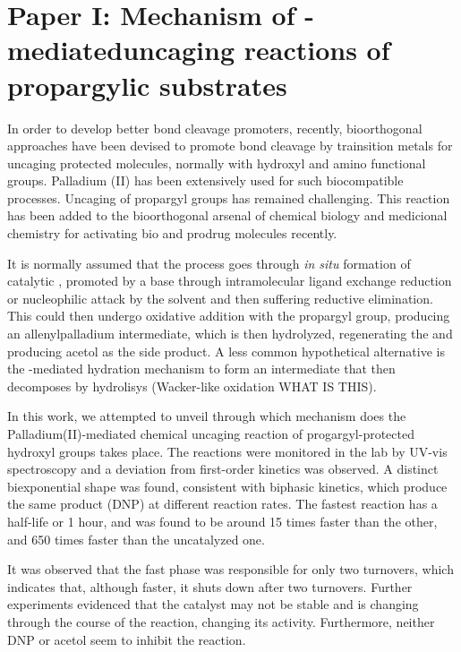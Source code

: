 \chapter{Paper I:\@
  Mechanism of -mediated\linebreak uncaging reactions %
  of propargylic substrates
 }%
\label{ch:paper1}


In order to develop better  bond cleavage promoters,
recently, bioorthogonal approaches have been devised to promote  bond
cleavage by trainsition metals for uncaging protected molecules, normally with
hydroxyl and amino functional groups.
Palladium (II) has been extensively used for such biocompatible processes.
Uncaging of propargyl groups has remained challenging.
This reaction has been added to the bioorthogonal arsenal of chemical biology and
medicional chemistry for activating bio and prodrug molecules recently.

It is normally assumed that the process goes through \emph{in situ} formation
of catalytic , promoted by a base through intramolecular ligand exchange
reduction or nucleophilic attack by the solvent and then suffering reductive
elimination. This  could then undergo oxidative addition with the
propargyl group, producing an allenylpalladium intermediate, which is then
hydrolyzed, regenerating the  and producing acetol as the side product.
A less common hypothetical alternative is the -mediated hydration
mechanism to form an intermediate that then decomposes by hydrolisys
(Wacker-like oxidation WHAT IS THIS).

In this work, we attempted to unveil through which mechanism does
the Palladium(II)-mediated chemical uncaging reaction of
progargyl-protected hydroxyl groups takes place.
The reactions were monitored in the lab by UV-vis spectroscopy and a deviation
from first-order kinetics was observed.
A distinct biexponential shape was found, consistent with biphasic kinetics,
which produce the same product (DNP) at different reaction rates.
The fastest reaction has a half-life or 1 hour, and was found to be around 15 times faster than the other, and
650 times faster than the uncatalyzed one.

It was observed that the fast phase was responsible for only two turnovers,
which indicates that, although faster, it shuts down after two turnovers.
Further experiments evidenced that the catalyst may not be stable and is changing through the
course of the reaction, changing its activity.
Furthermore, neither DNP or acetol seem to inhibit the reaction.

